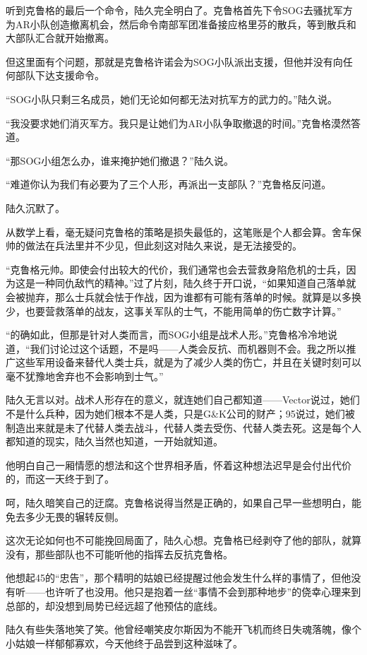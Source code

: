 听到克鲁格的最后一个命令，陆久完全明白了。克鲁格首先下令SOG去骚扰军方为AR小队创造撤离机会，然后命令南部军团准备接应格里芬的散兵，等到散兵和大部队汇合就开始撤离。

但这里面有个问题，那就是克鲁格许诺会为SOG小队派出支援，但他并没有向任何部队下达支援命令。

“SOG小队只剩三名成员，她们无论如何都无法对抗军方的武力的。”陆久说。

“我没要求她们消灭军方。我只是让她们为AR小队争取撤退的时间。”克鲁格漠然答道。

“那SOG小组怎么办，谁来掩护她们撤退？”陆久说。

“难道你认为我们有必要为了三个人形，再派出一支部队？”克鲁格反问道。

陆久沉默了。

从数学上看，毫无疑问克鲁格的策略是损失最低的，这笔账是个人都会算。舍车保帅的做法在兵法里并不少见，但此刻这对陆久来说，是无法接受的。

“克鲁格元帅。即使会付出较大的代价，我们通常也会去营救身陷危机的士兵，因为这是一种同仇敌忾的精神。”过了片刻，陆久终于开口说，“如果知道自己落单就会被抛弃，那么士兵就会怯于作战，因为谁都有可能有落单的时候。就算是以多换少，也要营救落单的战友，这事关军队的士气，不能用简单的伤亡数字计算。”

“的确如此，但那是针对人类而言，而SOG小组是战术人形。”克鲁格冷冷地说道，“我们讨论过这个话题，不是吗——人类会反抗、而机器则不会。我之所以推广这些军用设备来替代人类士兵，就是为了减少人类的伤亡，并且在关键时刻可以毫不犹豫地舍弃也不会影响到士气。”

陆久无言以对。战术人形存在的意义，就连她们自己都知道——Vector说过，她们不是什么兵种，因为她们根本不是人类，只是G\&K公司的财产；95说过，她们被制造出来就是未了代替人类去战斗，代替人类去受伤、代替人类去死。这是每个人都知道的现实，陆久当然也知道，一开始就知道。

他明白自己一厢情愿的想法和这个世界相矛盾，怀着这种想法迟早是会付出代价的，而这一天终于到了。

呵，陆久暗笑自己的迂腐。克鲁格说得当然是正确的，如果自己早一些想明白，能免去多少无畏的辗转反侧。

这次无论如何也不可能挽回局面了，陆久心想。克鲁格已经剥夺了他的部队，就算没有，那些部队也不可能听他的指挥去反抗克鲁格。

他想起45的“忠告”，那个精明的姑娘已经提醒过他会发生什么样的事情了，但他没有听——也许听了也没用。他只是抱着一丝“事情不会到那种地步”的侥幸心理来到总部的，却没想到局势已经远超了他预估的底线。

陆久有些失落地笑了笑。他曾经嘲笑皮尔斯因为不能开飞机而终日失魂落魄，像个小姑娘一样郁郁寡欢，今天他终于品尝到这种滋味了。


